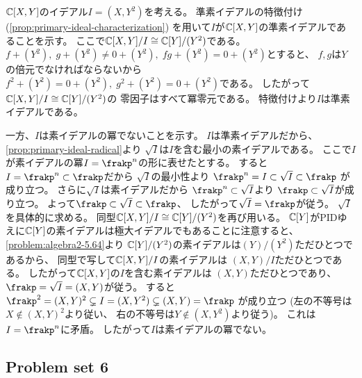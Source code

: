\documentclass[report]{jlreq}
\begin{document}
\begin{answer}

    $\mathbb{C}[X, Y]$のイデアル$I = (X, Y^2)$を考える。
    準素イデアルの特徴付け (\cref{prop:primary-ideal-characterization})
    を用いて$I$が$\mathbb{C}[X, Y]$の準素イデアルであることを示す。
    ここで$\mathbb{C}[X, Y] / I \cong \mathbb{C}[Y] / (Y^2)$である。
    $f + (Y^2), \; g + (Y^2) \neq 0 + (Y^2), \;
        fg + (Y^2) = 0 + (Y^2)$とすると、
    $f, g$は$Y$の倍元でなければならないから
    $f^2 + (Y^2) = 0 + (Y^2), \; g^2 + (Y^2) = 0 + (Y^2)$である。
    したがって$\mathbb{C}[X, Y] / I \cong \mathbb{C}[Y] / (Y^2)$の
    零因子はすべて冪零元である。
    特徴付けより$I$は準素イデアルである。

    一方、$I$は素イデアルの冪でないことを示す。
    $I$は準素イデアルだから、
    \cref{prop:primary-ideal-radical}より
    $\sqrt{I}$は$I$を含む最小の素イデアルである。
    ここで$I$が素イデアルの冪$I = \frakp^n$の形に表せたとする。
    すると$I = \frakp^n \subset \frakp$だから
    $\sqrt{I}$の最小性より
    $\frakp^n = I \subset \sqrt{I} \subset \frakp$
    が成り立つ。
    さらに$\sqrt{I}$は素イデアルだから
    $\frakp^n \subset \sqrt{I}$より
    $\frakp \subset \sqrt{I}$が成り立つ。
    よって$\frakp \subset \sqrt{I} \subset \frakp$、
    したがって$\sqrt{I} = \frakp$が従う。
    $\sqrt{I}$を具体的に求める。
    同型$\mathbb{C}[X, Y] / I \cong \mathbb{C}[Y] / (Y^2)$を再び用いる。
    $\mathbb{C}[Y]$がPIDゆえに$\mathbb{C}[Y]$の素イデアルは極大イデアルでもあることに注意すると、
    \cref{problem:algebra2-5.64}より
    $\mathbb{C}[Y] / (Y^2)$の素イデアルは$(Y) / (Y^2)$ただひとつであるから、
    同型で写して$\mathbb{C}[X, Y] / I$の素イデアルは
    $(X, Y) / I$ただひとつである。
    したがって$\mathbb{C}[X, Y]$の$I$を含む素イデアルは
    $(X, Y)$ただひとつであり、$\frakp = \sqrt{I} = (X, Y)$が従う。
    すると
    $\frakp^2 = (X, Y)^2 \subsetneq I = (X, Y^2) \subsetneq (X, Y) = \frakp$
    が成り立つ
    (左の不等号は$X \notin (X, Y)^2$より従い、
    右の不等号は$Y \notin (X, Y^2)$より従う)。
    これは$I = \frakp^n$に矛盾。
    したがって$I$は素イデアルの冪でない。
\end{answer}

\subsection{Problem set 6}

\end{document}
